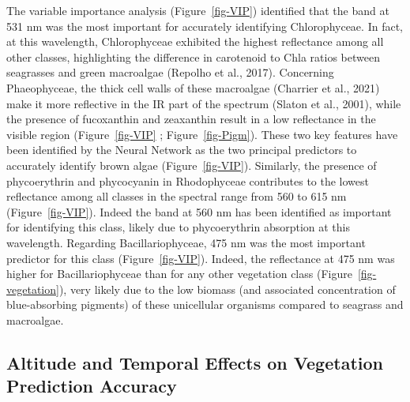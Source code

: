 \documentclass[
  letterpaper,
  11pt,
  english,
  singlespacing,
  headsepline]{MastersDoctoralThesis}
\begin{document}
\begin{spacing}{1.5}
The variable importance analysis (Figure~\ref{fig-VIP}) identified that
the band at 531 nm was the most important for accurately identifying
Chlorophyceae. In fact, at this wavelength, Chlorophyceae exhibited the
highest reflectance among all other classes, highlighting the difference
in carotenoid to Chla ratios between seagrasses and green macroalgae
(Repolho et al., 2017). Concerning Phaeophyceae, the thick cell walls of
these macroalgae (Charrier et al., 2021) make it more reflective in the
IR part of the spectrum (Slaton et al., 2001), while the presence of
fucoxanthin and zeaxanthin result in a low reflectance in the visible
region (Figure~\ref{fig-VIP} ; Figure~\ref{fig-Pigm}). These two key
features have been identified by the Neural Network as the two principal
predictors to accurately identify brown algae (Figure~\ref{fig-VIP}).
Similarly, the presence of phycoerythrin and phycocyanin in Rhodophyceae
contributes to the lowest reflectance among all classes in the spectral
range from 560 to 615 nm (Figure~\ref{fig-VIP}). Indeed the band at 560
nm has been identified as important for identifying this class, likely
due to phycoerythrin absorption at this wavelength. Regarding
Bacillariophyceae, 475 nm was the most important predictor for this
class (Figure~\ref{fig-VIP}). Indeed, the reflectance at 475 nm was
higher for Bacillariophyceae than for any other vegetation class
(Figure~\ref{fig-vegetation}), very likely due to the low biomass (and
associated concentration of blue-absorbing pigments) of these
unicellular organisms compared to seagrass and macroalgae.

\subsection{Altitude and Temporal Effects on Vegetation Prediction
Accuracy}\label{altitude-and-temporal-effects-on-vegetation-prediction-accuracy}


\end{spacing}
\end{document}
